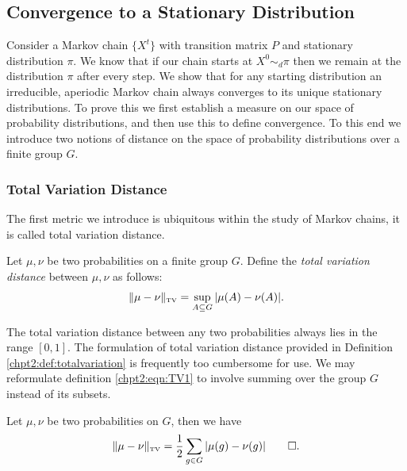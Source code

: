 \documentclass[11pt]{report}
\begin{document}
\subsection{Convergence to a Stationary Distribution}

Consider a Markov chain $\{X^{t}\}$ with transition matrix $P$ and stationary 
distribution $\pi$. We 
know that if our chain starts at $X^{0} \sim_{d} \pi$ then we 
remain at the distribution $\pi$ after every step. We show that for 
any starting distribution an irreducible, aperiodic Markov chain always converges to its unique stationary distributions. To prove this we 
first establish a measure on our space of probability distributions, and then use this to define convergence. To this end 
we introduce two notions of distance on the space of probability 
distributions over a finite group $G$.


\subsubsection{Total Variation Distance}

The first metric we introduce is ubiquitous within the study of Markov chains, it 
is called total variation distance.

\begin{defn}
	\label{chpt2:def:totalvariation}
	Let $\mu,\nu$ be two probabilities on a finite group $G$. Define the \emph{total 
		variation distance} between $\mu, \nu$ as follows:
	\begin{eqnarray}
	\lVert \mu - \nu \rVert_{\textnormal{\tiny TV}} = \sup_{A \subseteq G} | \mu(A) -\nu(A) |. \label{chpt2:eqn:TV1}
	\end{eqnarray}
\end{defn}

The total variation distance between any two probabilities always lies in the 
range $[0,1]$. The formulation of total variation distance provided in 
Definition \ref{chpt2:def:totalvariation} is frequently too cumbersome for use. 
We may reformulate definition \eqref{chpt2:eqn:TV1} to  involve summing over the group $G$ instead of its subsets.

\begin{lemma}
	\label{chpt2:lem:totalvariation}
	Let $\mu,\nu$ be two probabilities on $G$, then we have
	\[\lVert \mu - \nu \rVert_{\textnormal{\tiny TV}} = \frac{1}{2}\sum_{g\in 
		G} | \mu(g) - \nu(g)| \qedhere .\]
\end{lemma}
\end{document}
